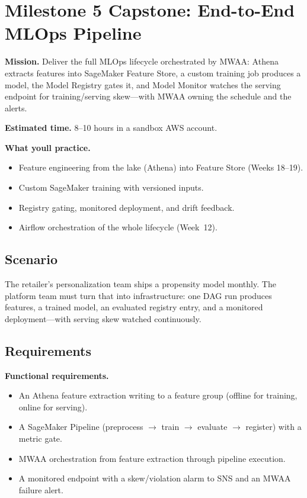 \section{Milestone 5 Capstone: End-to-End MLOps Pipeline}\label{sec:ch20-capstone}

\begin{capstonebox}
\textbf{Mission.} Deliver the full MLOps lifecycle orchestrated by MWAA: Athena extracts features into SageMaker Feature Store, a custom training job produces a model, the Model Registry gates it, and Model Monitor watches the serving endpoint for training/serving skew---with MWAA owning the schedule and the alerts.

\textbf{Estimated time.} 8--10 hours in a sandbox AWS account.

\textbf{What you\textquotesingle{}ll practice.}
\begin{itemize}
    \item Feature engineering from the lake (Athena) into Feature Store (Weeks 18--19).
    \item Custom SageMaker training with versioned inputs.
    \item Registry gating, monitored deployment, and drift feedback.
    \item Airflow orchestration of the whole lifecycle (Week~12).
\end{itemize}
\end{capstonebox}

\subsection*{Scenario}
The retailer's personalization team ships a propensity model monthly. The platform team must turn that into infrastructure: one DAG run produces features, a trained model, an evaluated registry entry, and a monitored deployment---with serving skew watched continuously.

\subsection*{Requirements}
\textbf{Functional requirements.}
\begin{itemize}
    \item An Athena feature extraction writing to a feature group (offline for training, online for serving).
    \item A SageMaker Pipeline (preprocess $\rightarrow$ train $\rightarrow$ evaluate $\rightarrow$ register) with a metric gate.
    \item MWAA orchestration from feature extraction through pipeline execution.
    \item A monitored endpoint with a skew/violation alarm to SNS and an MWAA failure alert.
\end{itemize}

